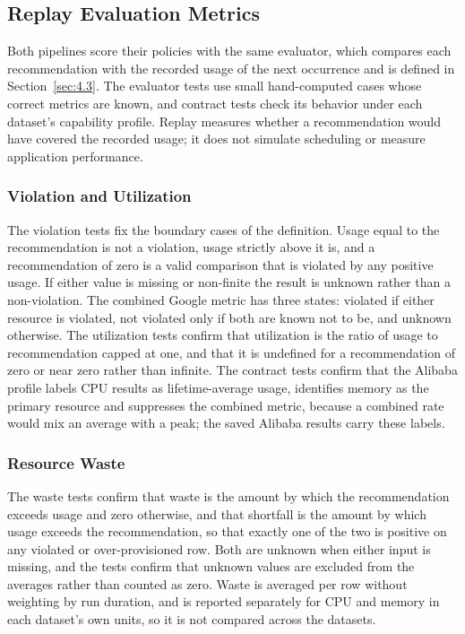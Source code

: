 \subsection{Replay Evaluation Metrics}\label{sec:6.4}

Both pipelines score their policies with the same evaluator, which compares each recommendation with the recorded usage of the next occurrence and is defined in Section~\ref{sec:4.3}. The evaluator tests use small hand-computed cases whose correct metrics are known, and contract tests check its behavior under each dataset's capability profile. Replay measures whether a recommendation would have covered the recorded usage; it does not simulate scheduling or measure application performance.

\subsubsection{Violation and Utilization}\label{sec:6.4.1}

The violation tests fix the boundary cases of the definition. Usage equal to the recommendation is not a violation, usage strictly above it is, and a recommendation of zero is a valid comparison that is violated by any positive usage. If either value is missing or non-finite the result is unknown rather than a non-violation. The combined Google metric has three states: violated if either resource is violated, not violated only if both are known not to be, and unknown otherwise. The utilization tests confirm that utilization is the ratio of usage to recommendation capped at one, and that it is undefined for a recommendation of zero or near zero rather than infinite. The contract tests confirm that the Alibaba profile labels CPU results as lifetime-average usage, identifies memory as the primary resource and suppresses the combined metric, because a combined rate would mix an average with a peak; the saved Alibaba results carry these labels.

\subsubsection{Resource Waste}\label{sec:6.4.2}

The waste tests confirm that waste is the amount by which the recommendation exceeds usage and zero otherwise, and that shortfall is the amount by which usage exceeds the recommendation, so that exactly one of the two is positive on any violated or over-provisioned row. Both are unknown when either input is missing, and the tests confirm that unknown values are excluded from the averages rather than counted as zero. Waste is averaged per row without weighting by run duration, and is reported separately for CPU and memory in each dataset's own units, so it is not compared across the datasets.

